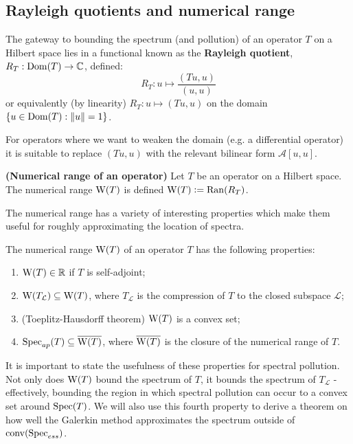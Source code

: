 \documentclass[../main.tex]{subfiles}
\begin{document}
\subsection{Rayleigh quotients and numerical range}
The gateway to bounding the spectrum (and pollution) of an operator $T$ on a
Hilbert space lies in a functional known as the \textbf{Rayleigh
quotient}, $R_T: \mathrm{Dom}(T) \rightarrow \mathbb{C}$,
defined:
\begin{equation*}
  R_T: u \mapsto \frac{( Tu, u )}{(u, u)}
\end{equation*} 
or equivalently (by linearity) $R_T: u \mapsto (Tu, u)$ on the domain $\{u \in
\mathrm{Dom}(T) : \|u\| = 1\}$.
 
For operators where we want to weaken the domain (e.g. a differential operator)
it is suitable to replace $(Tu, u)$ with the relevant bilinear form
$\mathcal{A}[u, u].$

\begin{definition}{\textbf{(Numerical range of an operator)}}
  Let $T$ be an operator on a Hilbert space. The
  numerical range $\mathrm{W}(T)$ is defined $\mathrm{W}(T) \mathrel{\mathop:}= \mathrm{Ran}(R_T)$.
\end{definition}

The numerical range has a variety of interesting properties which make them
useful for roughly approximating the location of spectra.

\begin{proposition}
\label{thm:num-range-props}
  The numerical range $\mathrm{W}(T)$ of an operator $T$ has the following properties:
  \begin{enumerate}
    \item
    \label{item:num-in-R}
	$\mathrm{W}(T) \in \mathbb{R}$ if $T$ is self-adjoint;
    \item
    \label{item:proj-num-range} 
	$\mathrm{W}(T_\mathcal{L}) \subseteq \mathrm{W}(T)$, where $T_\mathcal{L}$ is the compression of $T$ to the closed subspace $\mathcal{L}$;
    \item (Toeplitz-Hausdorff theorem)
    \label{item:toeplitz-hausdorff}
      $\mathrm{W}(T)$ is a convex set;
    \item
    \label{item:spec-in-num} 
      $\mathrm{Spec}_{ap}(T) \subseteq \overline{\mathrm{W}(T)}$,
     where $\overline{\mathrm{W}(T)}$ is the closure of the numerical range of $T$.
  \end{enumerate}
\end{proposition}

It is important to state the usefulness of these properties for spectral
pollution. Not only does $\mathrm{W}(T)$ bound the spectrum of $T$, it bounds the
spectrum of $T_\mathcal{L}$ - effectively, bounding the region in which spectral
pollution can occur to a convex set around $\mathrm{Spec}(T)$.
We will also use this fourth property to derive a theorem on how well the
Galerkin method approximates the spectrum outside of $\mathrm{conv}(\mathrm{Spec}_{ess})$.
\end{document}
